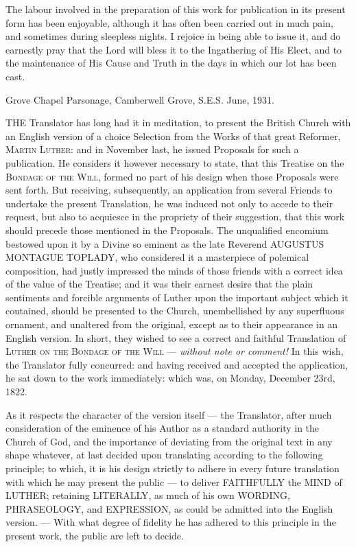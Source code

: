 The labour involved in the preparation of this work for publication in its present form has been enjoyable, although it has often been carried out in much pain, and sometimes during sleepless nights. I rejoice in being able to issue it, and do earnestly pray that the Lord will bless it to the Ingathering of His Elect, and to the maintenance of His Cause and Truth in the days in which our lot has been cast.

Grove Chapel Parsonage,  Camberwell Grove, S.E.S.   June, 1931.


THE Translator has long had it in meditation, to present the British Church with an English version of a choice Selection from the Works of that great Reformer, \textsc{Martin Luther}: and in November last, he issued Proposals for such a publication. He considers it however necessary to state, that this Treatise on the \textsc{Bondage of the Will}, formed no part of his design when those Proposals were sent forth. But receiving, subsequently, an application from several Friends to undertake the present Translation, he was induced not only to accede to their request, but also to acquiesce in the propriety of their suggestion, that this work should precede those mentioned in the Proposals. The unqualified encomium bestowed upon it by a Divine so eminent as the late Reverend \textsc{AUGUSTUS MONTAGUE TOPLADY}, who considered it a masterpiece of polemical composition, had justly impressed the minds of those friends with a correct idea of the value of the Treatise; and it was their earnest desire that the plain sentiments and forcible arguments of Luther upon the important subject which it contained, should be presented to the Church, unembellished by any superfluous ornament, and unaltered from the original, except as to their appearance in an English version. In short, they wished to see a correct and faithful Translation of \textsc{Luther on the Bondage of the Will} — \emph{without note or comment! }In this wish, the Translator fully concurred: and having received and accepted the application, he sat down to the work immediately: which was, on Monday, December 23rd, 1822.

As it respects the character of the version itself — the Translator, after much consideration of the eminence of his Author as a standard authority in the Church of God, and the importance of deviating from the original text in any shape whatever, at last decided upon translating according to the following principle; to which, it is his design strictly to adhere in every future translation with which he may present the public — to deliver \textsc{FAITHFULLY} the \textsc{MIND} of \textsc{LUTHER}; retaining \textsc{LITERALLY}, as much of his own \textsc{WORDING, PHRASEOLOGY}, and \textsc{EXPRESSION}, as could be admitted into the English version. — With what degree of fidelity he has adhered to this principle in the present work, the public are left to decide.

